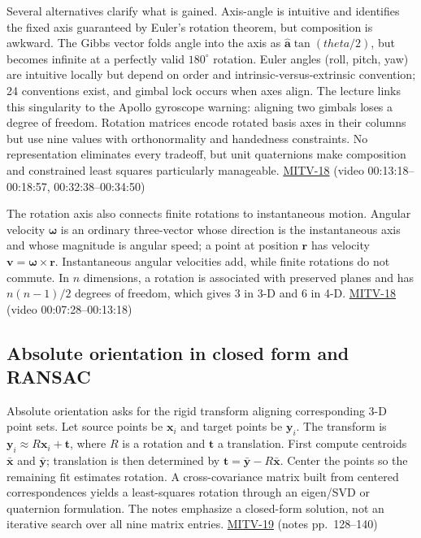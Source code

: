 Several alternatives clarify what is gained. Axis-angle is intuitive and identifies the fixed axis guaranteed by Euler's rotation theorem, but composition is awkward. The Gibbs vector folds angle into the axis as \(\hat{\mathbf{a}}\tan(theta/2)\), but becomes infinite at a perfectly valid \(180^\circ\) rotation. Euler angles (roll, pitch, yaw) are intuitive locally but depend on order and intrinsic-versus-extrinsic convention; 24 conventions exist, and gimbal lock occurs when axes align. The lecture links this singularity to the Apollo gyroscope warning: aligning two gimbals loses a degree of freedom. Rotation matrices encode rotated basis axes in their columns but use nine values with orthonormality and handedness constraints. No representation eliminates every tradeoff, but unit quaternions make composition and constrained least squares particularly manageable. \hyperref[04-visual-computing-ii-ch036-mitv-18---rotation-and-how-to-represent-it-unit-quaternions-the-space-of-rotations]{MITV-18} (video 00:13:18--00:18:57, 00:32:38--00:34:50)

The rotation axis also connects finite rotations to instantaneous motion. Angular velocity \(\boldsymbol{\omega}\) is an ordinary three-vector whose direction is the instantaneous axis and whose magnitude is angular speed; a point at position \(\mathbf{r}\) has velocity \(\mathbf{v}=\boldsymbol{\omega}\times\mathbf{r}\). Instantaneous angular velocities add, while finite rotations do not commute. In \(n\) dimensions, a rotation is associated with preserved planes and has \(n(n-1)/2\) degrees of freedom, which gives 3 in 3-D and 6 in 4-D. \hyperref[04-visual-computing-ii-ch036-mitv-18---rotation-and-how-to-represent-it-unit-quaternions-the-space-of-rotations]{MITV-18} (video 00:07:28--00:13:18)

\subsection{Absolute orientation in closed form and RANSAC}\label{04-visual-computing-ii-ch032-absolute-orientation-in-closed-form-and-ransac}

\hypertarget{04-visual-computing-ii-ch032-absolute-orientation-in-closed-form-and-ransac}{}

Absolute orientation asks for the rigid transform aligning corresponding 3-D point sets. Let source points be \(\mathbf{x}_i\) and target points be \(\mathbf{y}_i\). The transform is \(\mathbf{y}_i\approx R\mathbf{x}_i+\mathbf{t}\), where \(R\) is a rotation and \(\mathbf{t}\) a translation. First compute centroids \(\bar{\mathbf{x}}\) and \(\bar{\mathbf{y}}\); translation is then determined by \(\mathbf{t}=\bar{\mathbf{y}}-R\bar{\mathbf{x}}\). Center the points so the remaining fit estimates rotation. A cross-covariance matrix built from centered correspondences yields a least-squares rotation through an eigen/SVD or quaternion formulation. The notes emphasize a closed-form solution, not an iterative search over all nine matrix entries. \hyperref[04-visual-computing-ii-ch036-mitv-19---absolute-orientation-in-closed-form-outliers-and-robustness-ransac]{MITV-19} (notes pp.~128--140)

